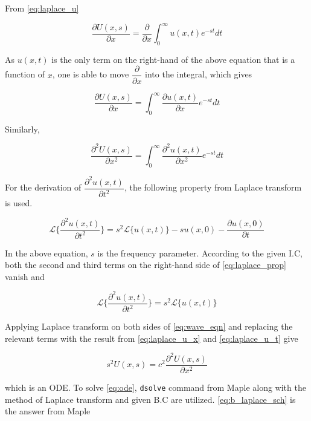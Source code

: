\documentclass{article}
\begin{document}
From \cref{eq:laplace_u}

\begin{equation*}
    \dfrac{\partial U(x, s)}{\partial x} = \dfrac{\partial}{\partial x} \int_{0}^{\infty} u(x, t) e^{-st} dt
\end{equation*}

As $u(x, t)$ is the only term on the right-hand of the above equation that is a function of $x$, one is able to move $\dfrac{\partial}{\partial x}$ into the integral, which gives

\begin{equation*}
    \dfrac{\partial U(x, s)}{\partial x} = \int_{0}^{\infty} \dfrac{\partial u(x, t)}{\partial x} e^{-st} dt
\end{equation*}

Similarly,

\begin{equation}
    \dfrac{\partial^2 U(x, s)}{\partial x^2} = \int_{0}^{\infty} \dfrac{\partial^2 u(x, t)}{\partial x^2} e^{-st} dt
    \label{eq:laplace_u_x}
\end{equation}

For the derivation of $\dfrac{\partial^2 u(x, t)}{\partial t^2}$, the following property from Laplace transform is used.

\begin{equation}
    \mathcal{L}\{\dfrac{\partial ^2u(x, t)}{\partial t^2}\} = s^2 \mathcal{L}\{u(x, t)\} - s u(x, 0) - \dfrac{\partial u(x, 0)}{\partial t}
    \label{eq:laplace_prop}
\end{equation}

In the above equation, $s$ is the frequency parameter. According to the given I.C, both the second and third terms on the right-hand side of \cref{eq:laplace_prop} vanish and 

\begin{equation}
    \mathcal{L}\{\dfrac{\partial ^2u(x, t)}{\partial t^2}\} = s^2 \mathcal{L}\{u(x, t)\}
    \label{eq:laplace_u_t}
\end{equation}

Applying Laplace transform on both sides of \cref{eq:wave_eqn} and replacing the relevant terms with the result from \cref{eq:laplace_u_x} and \cref{eq:laplace_u_t} give

\begin{equation}
    s^2 U(x, s) = c^2 \dfrac{\partial^2 U(x, s)}{\partial x^2}
    \label{eq:ode}
\end{equation}

which is an ODE. To solve \cref{eq:ode}, \texttt{dsolve} command from Maple along with the method of Laplace transform and given B.C are utilized. \cref{eq:b_laplace_sch} is the answer from Maple 
\end{document}
